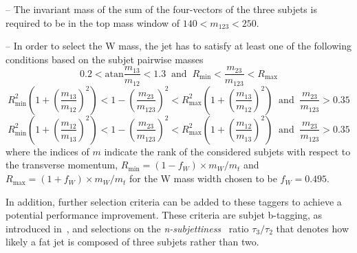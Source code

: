 \begin{description}
\begin{description}
 \item -- The invariant mass of the sum of the four-vectors of the three subjets is required to be in the top mass window of $140 < m_{\mathrm{123}} < 250$\gev.
 \item -- In order to select the W mass, the jet has to satisfy at least one of the following conditions based on the subjet pairwise masses
 \begin{equation}
0.2 < \mathrm{atan} \frac{m_{\mathrm{13}}}{m_{\mathrm{12}}} < 1.3 \; \; \mathrm{and} \; \; R_{\mathrm{min}} < \frac{m_{\mathrm{23}}}{m_{\mathrm{123}}} < R_{\mathrm{max}} 
\label{eq:hep_1}
 \end{equation}
 \begin{equation}
 R^2_{\mathrm{min}} \left( 1+ \left(\frac{m_{\mathrm{13}}}{m_{\mathrm{12}}}\right)^2 \right)  < 1 - \left( \frac{m_{\mathrm{23}}}{m_{\mathrm{123}}} \right)^2  < R^2_{\mathrm{max}} \left( 1+\left(\frac{m_{\mathrm{13}}}{m_{\mathrm{12}}} \right)^2 \right) \; \; \mathrm{and} \; \; \frac{m_{\mathrm{23}}}{m_{\mathrm{123}}} > 0.35 
\label{eq:hep_2}
\end{equation}
\begin{equation}
 R^2_{\mathrm{min}} \left( 1+ \left(\frac{m_{\mathrm{12}}}{m_{\mathrm{13}}} \right)^2 \right)  < 1 - \left(\frac{m_{\mathrm{23}}}{m_{\mathrm{123}}}\right)^2 < R^2_{\mathrm{max}}\left(1+ \left(\frac{m_{\mathrm{12}}}{m_{\mathrm{13}}} \right)^2 \right) \; \; \mathrm{and} \; \; \frac{m_{\mathrm{23}}}{m_{\mathrm{123}}} > 0.35 
\label{eq:hep_3}
\end{equation}
where the indices of $m$ indicate the rank of the considered subjets with respect to the transverse momentum, $R_{\mathrm{min}} = (1 - f_{W}) \times m_W/m_t$ and $R_{\mathrm{max}} = (1 + f_{W}) \times m_W/m_t$ for the W mass width chosen to be $f_W = 0.495$.  
\end{description}
\end{description}
In addition, further selection criteria can be added to these taggers to achieve a potential performance improvement. These criteria are subjet b-tagging, as introduced in~\cite{CMS-PAS-BTV-13-001}, and selections on the \textit{n-subjettiness}~\cite{Thaler:2010tr, Thaler:2011gf} ratio $\tau_3/\tau_2$ that denotes how likely a fat jet is composed of three subjets rather than two. \\
